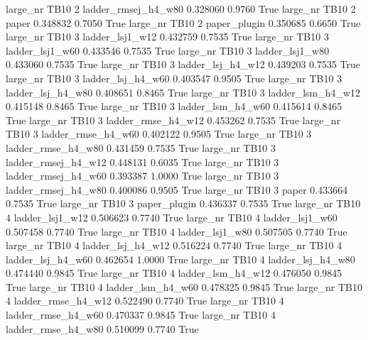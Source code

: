   large_nr     TB10                 2 ladder_rmsej_h4_w80   0.328060      0.9760    True
  large_nr     TB10                 2               paper   0.348832      0.7050    True
  large_nr     TB10                 2        paper_plugin   0.350685      0.6650    True
  large_nr     TB10                 3     ladder_lsj1_w12   0.432759      0.7535    True
  large_nr     TB10                 3     ladder_lsj1_w60   0.433546      0.7535    True
  large_nr     TB10                 3     ladder_lsj1_w80   0.433060      0.7535    True
  large_nr     TB10                 3   ladder_lsj_h4_w12   0.439203      0.7535    True
  large_nr     TB10                 3   ladder_lsj_h4_w60   0.403547      0.9505    True
  large_nr     TB10                 3   ladder_lsj_h4_w80   0.408651      0.8465    True
  large_nr     TB10                 3   ladder_lsm_h4_w12   0.415148      0.8465    True
  large_nr     TB10                 3   ladder_lsm_h4_w60   0.415614      0.8465    True
  large_nr     TB10                 3  ladder_rmse_h4_w12   0.453262      0.7535    True
  large_nr     TB10                 3  ladder_rmse_h4_w60   0.402122      0.9505    True
  large_nr     TB10                 3  ladder_rmse_h4_w80   0.431459      0.7535    True
  large_nr     TB10                 3 ladder_rmsej_h4_w12   0.448131      0.6035    True
  large_nr     TB10                 3 ladder_rmsej_h4_w60   0.393387      1.0000    True
  large_nr     TB10                 3 ladder_rmsej_h4_w80   0.400086      0.9505    True
  large_nr     TB10                 3               paper   0.433664      0.7535    True
  large_nr     TB10                 3        paper_plugin   0.436337      0.7535    True
  large_nr     TB10                 4     ladder_lsj1_w12   0.506623      0.7740    True
  large_nr     TB10                 4     ladder_lsj1_w60   0.507458      0.7740    True
  large_nr     TB10                 4     ladder_lsj1_w80   0.507505      0.7740    True
  large_nr     TB10                 4   ladder_lsj_h4_w12   0.516224      0.7740    True
  large_nr     TB10                 4   ladder_lsj_h4_w60   0.462654      1.0000    True
  large_nr     TB10                 4   ladder_lsj_h4_w80   0.474440      0.9845    True
  large_nr     TB10                 4   ladder_lsm_h4_w12   0.476050      0.9845    True
  large_nr     TB10                 4   ladder_lsm_h4_w60   0.478325      0.9845    True
  large_nr     TB10                 4  ladder_rmse_h4_w12   0.522490      0.7740    True
  large_nr     TB10                 4  ladder_rmse_h4_w60   0.470337      0.9845    True
  large_nr     TB10                 4  ladder_rmse_h4_w80   0.510099      0.7740    True
